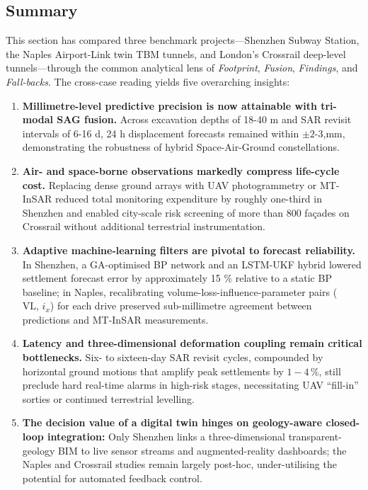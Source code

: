\documentclass[preprint,11pt,authoryear,3p]{elsarticle}
\begin{document}
\subsection{Summary}
\label{subsec:sec4_summary_en}

This section has compared three benchmark projects—Shenzhen Subway Station, the Naples Airport-Link twin TBM tunnels, and London's Crossrail deep-level tunnels—through the common analytical lens of \emph{Footprint}, \emph{Fusion}, \emph{Findings}, and \emph{Fall-backs}.  The cross-case reading yields five overarching insights:

\begin{enumerate}
  \item \textbf{Millimetre-level predictive precision is now attainable with tri-modal SAG fusion.}  Across excavation depths of 18-40 m and SAR revisit intervals of 6-16 d, 24 h displacement forecasts remained within \(\pm\!2\text{-}3\),mm, demonstrating the robustness of hybrid Space-Air-Ground constellations.

  \item \textbf{Air- and space-borne observations markedly compress life-cycle cost.}  Replacing dense ground arrays with UAV photogrammetry or MT-InSAR reduced total monitoring expenditure by roughly one-third in Shenzhen and enabled city-scale risk screening of more than 800 façades on Crossrail without additional terrestrial instrumentation.

  \item \textbf{Adaptive machine-learning filters are pivotal to forecast reliability.}  In Shenzhen, a GA-optimised BP network and an LSTM-UKF hybrid lowered settlement forecast error by approximately 15 \% relative to a static BP baseline; in Naples, recalibrating volume-loss-influence-parameter pairs ($\mathrm{VL},\,i_x$) for each drive preserved sub-millimetre agreement between predictions and MT-InSAR measurements.

  \item \textbf{Latency and three-dimensional deformation coupling remain critical bottlenecks.}  Six- to sixteen-day SAR revisit cycles, compounded by horizontal ground motions that amplify peak settlements by $1\!-\!4\,\%$, still preclude hard real-time alarms in high-risk stages, necessitating UAV “fill-in'' sorties or continued terrestrial levelling.

  \item \textbf{The decision value of a digital twin hinges on geology-aware closed-loop integration:} Only Shenzhen links a three-dimensional transparent-geology BIM to live sensor streams and augmented-reality dashboards; the Naples and Crossrail studies remain largely post-hoc, under-utilising the potential for automated feedback control.
\end{enumerate}
\end{document}
